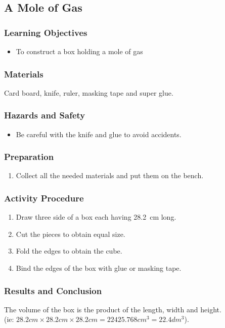 \subsection{A Mole of Gas}

\subsubsection*{Learning Objectives}
\begin{itemize}
\item{To construct a box holding a mole of gas}
\end{itemize}

\subsubsection*{Materials}
Card board, knife, ruler, masking tape and super glue.

\subsubsection*{Hazards and Safety}
\begin{itemize}
\item{Be careful with the knife and glue to avoid accidents.}
\end{itemize}

\subsubsection*{Preparation}
\begin{enumerate}
\item{Collect all the needed materials and put them on the bench.}
\end{enumerate}

\subsubsection*{Activity Procedure}
\begin{enumerate}
\item{Draw three side of a box each having 28.2~cm long.}
\item{Cut the pieces to obtain equal size.}
\item{Fold the edges to obtain the cube.}
\item{Bind the edges of the box with glue or masking tape.}
\end{enumerate}

\subsubsection*{Results and Conclusion}
The volume of the box is the product of the length, width and height. \\(ie: $28.2 cm \times 28.2 cm \times 28.2cm = 22425.768cm^{3} = 22.4dm^{3}$).

